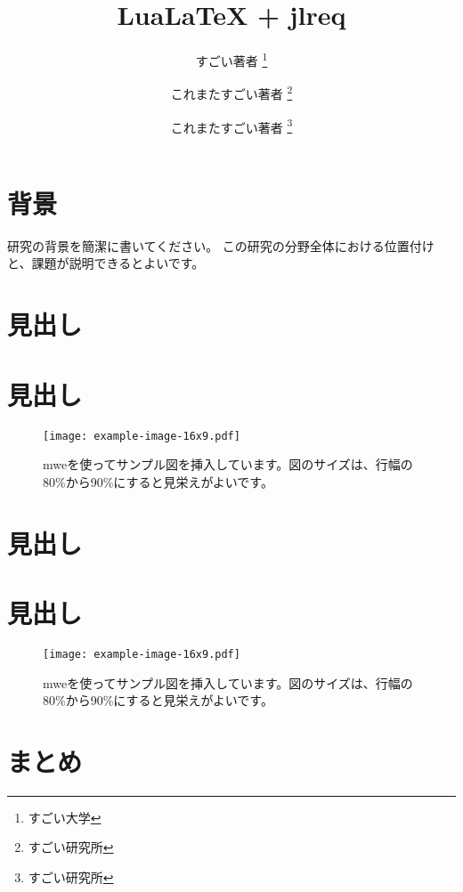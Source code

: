 \documentclass[article, paper=a0, jafontsize=30pt, twocolumn]{jlreq}
\title{LuaLaTeX + jlreq}
\author{
    すごい著者 \thanks{すごい大学} \\ \and
    これまたすごい著者 \thanks{すごい研究所} \\ \and
    これまたすごい著者 \thanks{すごい研究所}
}
\begin{document}
\thispagestyle{fancy}
\fancyfoot[R]{\thepage}

\maketitle

\section{背景}

研究の背景を簡潔に書いてください。
この研究の分野全体における位置付けと、課題が説明できるとよいです。


\section{見出し}

\blindtext
{}

\section{見出し}


\begin{figure}
    \centering
    \texttt{[image: example-image-16x9.pdf]}
    \caption{mweを使ってサンプル図を挿入しています。図のサイズは、行幅の80\%から90\%にすると見栄えがよいです。}
\end{figure}

\section{見出し}


\section{見出し}


\begin{figure}
    \centering
    \texttt{[image: example-image-16x9.pdf]}
    \caption{mweを使ってサンプル図を挿入しています。図のサイズは、行幅の80\%から90\%にすると見栄えがよいです。}
\end{figure}


\section{まとめ}

\end{document}
